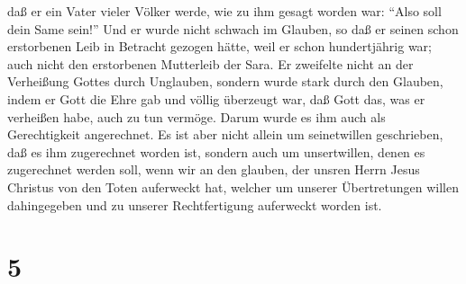 daß er ein Vater vieler Völker werde, wie zu ihm gesagt worden war:
``Also soll dein Same sein!''  Und er wurde nicht schwach
im Glauben, so daß er seinen schon erstorbenen Leib in Betracht gezogen
hätte, weil er schon hundertjährig war; auch nicht den erstorbenen
Mutterleib der Sara.  Er zweifelte nicht an der
Verheißung Gottes durch Unglauben, sondern wurde stark durch den
Glauben, indem er Gott die Ehre gab  und völlig überzeugt
war, daß Gott das, was er verheißen habe, auch zu tun vermöge.
 Darum wurde es ihm auch als Gerechtigkeit angerechnet.
 Es ist aber nicht allein um seinetwillen geschrieben,
daß es ihm zugerechnet worden ist,  sondern auch um
unsertwillen, denen es zugerechnet werden soll, wenn wir an den glauben,
der unsren Herrn Jesus Christus von den Toten auferweckt hat,
 welcher um unserer Übertretungen willen dahingegeben und
zu unserer Rechtfertigung auferweckt worden ist.

\hypertarget{section-4}{%
\section{5}\label{section-4}}

